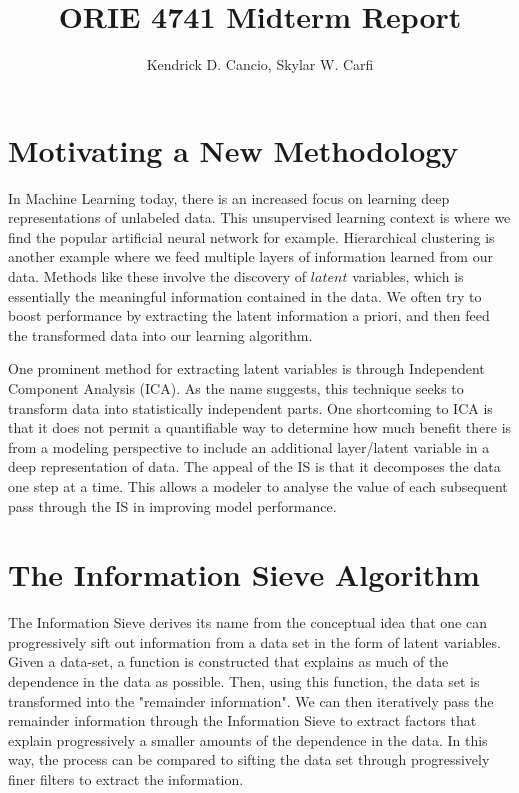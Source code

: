 \documentclass[12pt]{article}
\title{ORIE 4741 Midterm Report}
\author{Kendrick D. Cancio, Skylar W. Carfi}
\begin{document}
 
\maketitle


\section{Motivating a New Methodology}
In Machine Learning today, there is an increased focus on learning deep representations of unlabeled data. This unsupervised learning context is where we find the popular artificial neural network for example. Hierarchical clustering is another example where we feed multiple layers of information learned from our data. Methods like these involve the discovery of $latent$ variables, which is essentially the meaningful information contained in the data. We often try to boost performance by extracting the latent information a priori, and then feed the transformed data into our learning algorithm. \newline

One prominent method for extracting latent variables is through Independent Component Analysis (ICA). As the name suggests, this technique seeks to transform data into statistically independent parts. One shortcoming to ICA is that it does not permit a quantifiable way to determine how much benefit there is from a modeling perspective to include an additional layer/latent variable in a deep representation of data. 
The appeal of the IS is that it decomposes the data one step at a time. This allows a modeler to analyse the value of each subsequent pass through the IS in improving model performance. 

\section{The Information Sieve Algorithm} \label{sec:firstpage}
The Information Sieve derives its name from the conceptual idea that one can progressively sift out information from a data set in the form of latent variables. Given a data-set, a function is constructed that explains as much of the dependence in the data as possible. Then, using this function, the data set is transformed into the "remainder information". We can then iteratively pass the remainder information through the Information Sieve to extract factors that explain progressively a smaller amounts of the dependence in the data. In this way, the process can be compared to sifting the data set through progressively finer filters to extract the information.
\end{document}
